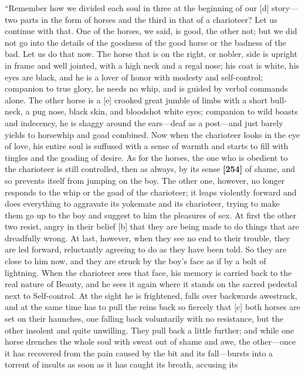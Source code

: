 “Remember how we divided each soul in three at the beginning of our
{[}d{]} story---two parts in the form of horses and the third in that of
a charioteer? Let us continue with that. One of the horses, we said, is
good, the other not; but we did not go into the details of the goodness
of the good horse or the badness of the bad. Let us do that now. The
horse that is on the right, or nobler, side is upright in frame and well
jointed, with a high neck and a regal nose; his coat is white, his eyes
are black, and he is a lover of honor with modesty and self-control;
companion to true glory, he needs no whip, and is guided by verbal
commands alone. The other horse is a {[}e{]} crooked great jumble of
limbs with a short bull-neck, a pug nose, black skin, and bloodshot
white eyes; companion to wild boasts and indecency, he is shaggy around
the ears---deaf as a post---and just barely yields to horsewhip and goad
combined. Now when the charioteer looks in the eye of love, his entire
soul is suffused with a sense of warmth and starts to fill with tingles
and the goading of desire. As for the horses, the one who is obedient to
the charioteer is still controlled, then as always, by its sense
{\bf {[}254{]}} of shame, and so prevents itself from jumping on the
boy. The other one, however, no longer responds to the whip or the goad
of the charioteer; it leaps violently forward and does everything to
aggravate its yokemate and its charioteer, trying to make them go up to
the boy and suggest to him the pleasures of sex. At first the other two
resist, angry in their belief {[}b{]} that they are being made to do
things that are dreadfully wrong. At last, however, when they see no end
to their trouble, they are led forward, reluctantly agreeing to do as
they have been told. So they are close to him now, and they are struck
by the boy's face as if by a bolt of lightning. When the charioteer sees
that face, his memory is carried back to the real nature of Beauty, and
he sees it again where it stands on the sacred pedestal next to
Self-control. At the sight he is frightened, falls over backwards
awestruck, and at the same time has to pull the reins back so fiercely
that {[}c{]} both horses are set on their haunches, one falling back
voluntarily with no resistance, but the other insolent and quite
unwilling. They pull back a little further; and while one horse drenches
the whole soul with sweat out of shame and awe, the other---once it has
recovered from the pain caused by the bit and its fall---bursts into a
torrent of insults as soon as it has caught its breath, accusing its

